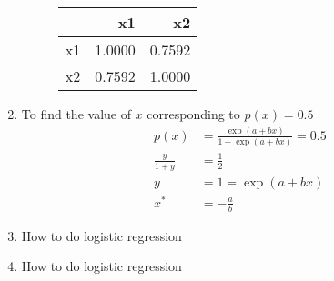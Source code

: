 \begin{enumerate}
\begin{figure}[H]
	\centering
	\renewcommand{\arraystretch}{2}
\begin{tabular}{lrr}
	\toprule
	{} &      x1 &       x2 \\
	\midrule
	x1 &  1.0000 &  0.7592 \\
	x2  &  0.7592 &  1.0000 \\
	\bottomrule
\end{tabular}
\end{figure}


\item To find the value of $ x $ corresponding to $ p(x) = 0.5 $\\

\begin{align}
	p(x) &= \frac{\exp(a + bx)}{1 + \exp(a + bx)} = 0.5 \nonumber \\
	\frac{y}{1 + y} &= \frac{1}{2} \nonumber \\
	y &= 1 = \exp (a + bx) \nonumber \\
	x^* &= -\frac{a}{b}
\end{align}

\item How to do logistic regression

\item How to do logistic regression



\end{enumerate}


